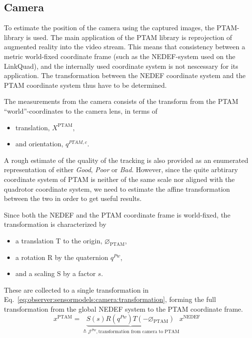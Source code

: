 \subsection{Camera}
\label{ssec:observer:sensormodels:camera}
    To estimate the position of the camera using the captured images,
    the PTAM-library is used.
    The main application of the PTAM library is reprojection of
    augmented reality into the video stream.
    This means that consistency between a metric world-fixed
    coordinate frame (such as the NEDEF-system used on the LinkQuad), and the
    internally used coordinate system is not nescessary for its application.
    The transformation between the NEDEF coordinate system and the
    PTAM coordinate system thus have to be determined.

    The measurements from the camera consists of the transform from the PTAM ``world''-coordinates
    to the camera lens, in terms of
    \begin{itemize}
        \item translation, $X^{\text{PTAM}}$,
        \item and orientation, $q^{PTAM,c}$.
    \end{itemize}
    A rough estimate of the quality of the tracking is also provided as an enumerated representation of either \textit{Good}, \textit{Poor} or \textit{Bad}.
    However, since the quite arbtirary \citep{klein07parallel} coordinate system
    of PTAM is neither of the same scale nor aligned with the quadrotor coordinate system,
    we need to estimate the affine transformation between the two in order to get useful results.

    Since both the NEDEF and the PTAM coordinate frame is world-fixed, the transformation is characterized by
    \begin{itemize}
        \item a translation T to the origin, $\varnothing_{\text{PTAM}}$,
        \item a rotation R by the quaternion $q^{Pw}$,
        \item and a scaling S by a factor $s$.
    \end{itemize}
    These are collected to a single transformation in Eq.~\ref{eq:observer:sensormodels:camera:transformation},
    forming the full transformation from the global NEDEF system to the
    PTAM coordinate frame.
    \begin{equation}
        \label{eq:observer:sensormodels:camera:transformation}
        x^{\text{PTAM}} = \underbrace{S(s) R(q^{Pw}) T(-\varnothing_{\text{PTAM}})}_{\triangleq \mathcal{J}^{Pw}, \text{transformation from camera to PTAM}}
         x^{\text{NEDEF}}
    \end{equation}

